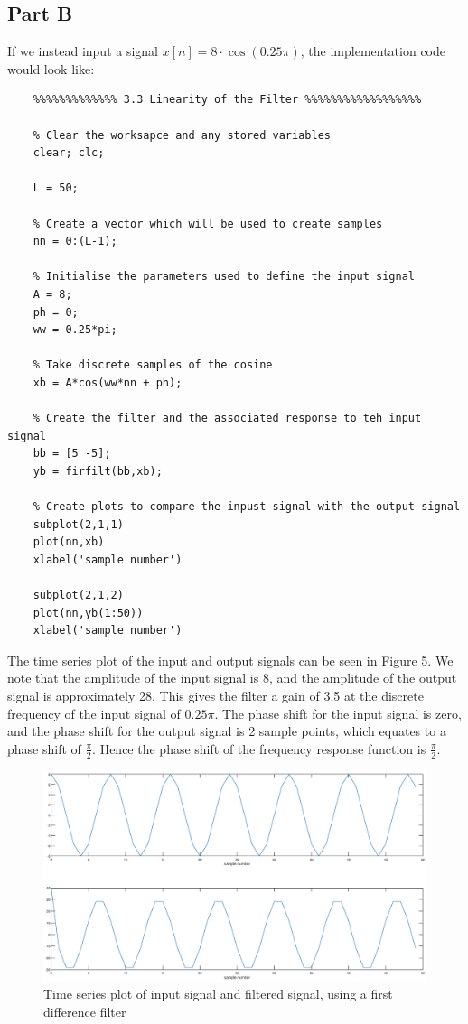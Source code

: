 \documentclass{article}
\begin{document}
\subsection{Part B}

If we instead input a signal $x[n] = 8 \cdot \cos(0.25 \pi)$, the implementation code would look like:
\begin{lstlisting}
	%%%%%%%%%%%%% 3.3 Linearity of the Filter %%%%%%%%%%%%%%%%%%
	
	% Clear the worksapce and any stored variables
	clear; clc;
	
	L = 50;
	
	% Create a vector which will be used to create samples
	nn = 0:(L-1);
	
	% Initialise the parameters used to define the input signal
	A = 8;
	ph = 0;
	ww = 0.25*pi;
	
	% Take discrete samples of the cosine
	xb = A*cos(ww*nn + ph);
	
	% Create the filter and the associated response to teh input signal
	bb = [5 -5];
	yb = firfilt(bb,xb);
	
	% Create plots to compare the inpust signal with the output signal
	subplot(2,1,1)
	plot(nn,xb)
	xlabel('sample number')
	
	subplot(2,1,2)
	plot(nn,yb(1:50))
	xlabel('sample number')
\end{lstlisting}

The time series plot of the input and output signals can be seen in Figure 5. We note that the amplitude of the input signal is 8, and the amplitude of the output signal is approximately 28. This gives the filter a gain of 3.5 at the discrete frequency of the input signal of $0.25 \pi$. The phase shift for the input signal is zero, and the phase shift for the output signal is 2 sample points, which equates to a phase shift of $\frac{\pi}{2}$. Hence the phase shift of the frequency response function is $\frac{\pi}{2}$.

\begin{figure}[H]
	\centering
	\includegraphics[scale=0.3]{fig5}
	\caption{Time series plot of input signal and filtered signal, using a first difference filter}
\end{figure}
\end{document}
